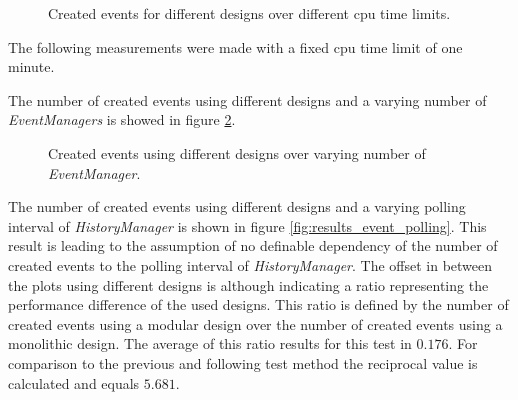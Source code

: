 \begin{figure}
    \centering
    \caption{Created events for different designs over different cpu time limits.}
    \label{fig:results_event_cpu_time}
\end{figure}

The following measurements were made with a fixed cpu time limit of one minute.

The number of created events using different designs and a varying number of \emph{EventManagers} is showed in figure \ref{fig:results_event_eventmanager}.
\\

\begin{figure}
    \centering
    \caption{Created events using different designs over varying number of \emph{EventManager}.}
    \label{fig:results_event_eventmanager}
\end{figure}

The number of created events using different designs and a varying polling interval of \emph{HistoryManager} is shown in figure \ref{fig:results_event_polling}.
This result is leading to the assumption of no definable dependency of the number of created events to the polling interval of \emph{HistoryManager}.
The offset in between the plots using different designs is although indicating a ratio representing the performance difference of the used designs.
This ratio is defined by the number of created events using a modular design over the number of created events using a monolithic design.
The average of this ratio results for this test in $0.176$.
For comparison to the previous and following test method the reciprocal value is calculated and equals $5.681$.
\\

